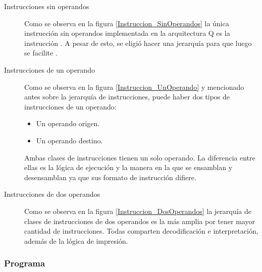 \begin{description}
\item[Instrucciones sin operandos] Como se observa en la figura \ref{Instruccion_SinOperandos} la única instrucción sin operandos implementada en la arquitectura Q es la instrucción . A pesar de esto, se eligió hacer una jerarquía para que luego se facilite .


\item[Instrucciones de un operando] 
Como se observa en la figura \ref{Instruccion_UnOperando} y  mencionado antes sobre la jerarquía de instrucciones, puede haber dos tipos de instrucciones de un operando:

\begin{itemize}
\item Un operando origen.
\item Un operando destino.
\end{itemize}

Ambas clases de instrucciones tienen un solo operando. La diferencia entre ellas es la lógica de ejecución y la manera en la que se ensamblan y desensamblan ya que sus formato de instrucción difiere.



\item[Instrucciones de dos operandos]

Como se observa en la figura \ref{Instruccion_DosOperandos} la jerarquía de clases de instrucciones de dos operandos es la más amplia por tener mayor cantidad de instrucciones. Todas comparten  decodificación e interpretación, además de la lógica de impresión.


\end{description}




\subsubsection{Programa}

